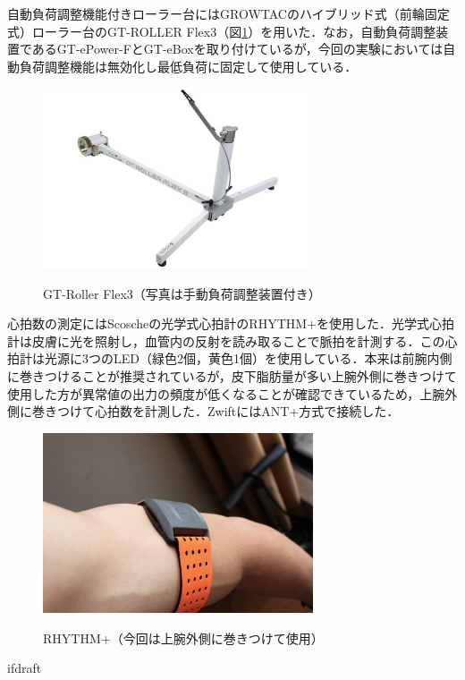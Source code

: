 自動負荷調整機能付きローラー台にはGROWTACのハイブリッド式（前輪固定式）ローラー台のGT-ROLLER Flex3（図\ref{fig:gt-roller_flex3}）を用いた．なお，自動負荷調整装置であるGT-ePower-FとGT-eBoxを取り付けているが，今回の実験においては自動負荷調整機能は無効化し最低負荷に固定して使用している．

\begin{figure}[H]
  \begin{center}
    \label{fig:gt-roller_flex3}
    \includegraphics[width=8cm]{fig/gt-roller_flex3}
    \caption{GT-Roller Flex3（写真は手動負荷調整装置付き）}
  \end{center}
\end{figure}

心拍数の測定にはScoscheの光学式心拍計のRHYTHM+を使用した．光学式心拍計は皮膚に光を照射し，血管内の反射を読み取ることで脈拍を計測する．この心拍計は光源に3つのLED（緑色2個，黄色1個）を使用している．本来は前腕内側に巻きつけることが推奨されているが，皮下脂肪量が多い上腕外側に巻きつけて使用した方が異常値の出力の頻度が低くなることが確認できているため，上腕外側に巻きつけて心拍数を計測した．ZwiftにはANT+方式で接続した．

\begin{figure}[H]
  \begin{center}
    \label{fig:rhythm}
    \includegraphics[width=8cm]{fig/rhythm}
    \caption{RHYTHM+（今回は上腕外側に巻きつけて使用）}
  \end{center}
\end{figure}

\expandafter\ifx\csname ifdraft\endcsname\relax
  
\fi
